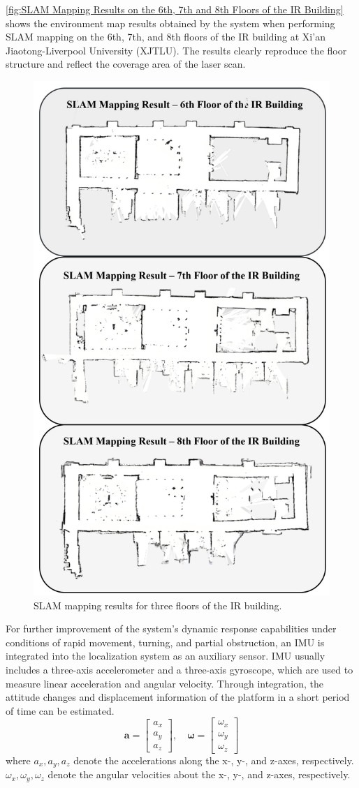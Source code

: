 \documentclass[12pt,a4paper]{article}
\numberwithin{equation}{section}
\begin{document}
\autoref{fig:SLAM Mapping Results on the 6th, 7th and 8th Floors of the IR
  Building} shows the environment map results obtained by the system when
performing SLAM mapping on the 6th, 7th, and 8th floors of the IR building at
Xi'an Jiaotong-Liverpool University (XJTLU). The results clearly reproduce the
floor structure and reflect the coverage area of the laser scan.
\begin{figure}[H]
  \centering
  \includegraphics[width=0.48\linewidth]{images/slam.png}
  \caption{SLAM mapping results for three floors of the IR building.}
  \label{fig:SLAM Mapping Results on the 6th, 7th and 8th Floors of the IR
    Building}
\end{figure}

For further improvement of the system's dynamic response capabilities under
conditions of rapid movement, turning, and partial obstruction, an IMU is
integrated into the localization system as an auxiliary sensor. IMU usually
includes a three-axis accelerometer and a three-axis gyroscope, which are used
to measure linear acceleration and angular velocity. Through integration, the
attitude changes and displacement information of the platform in a short period
of time can be estimated.
\begin{equation}
  \boldsymbol{a} =
  \begin{bmatrix}
    a_x \\ a_y \\ a_z
  \end{bmatrix}, \quad
  \boldsymbol{\omega} =
  \begin{bmatrix}
    \omega_x \\ \omega_y \\ \omega_z
  \end{bmatrix}
\end{equation}
where $a_x, a_y, a_z$ denote the accelerations along the x-, y-, and z-axes,
respectively. $\omega_x, \omega_y, \omega_z$ denote the angular velocities about
the x-, y-, and z-axes, respectively.
\end{document}
